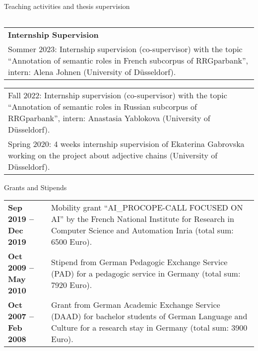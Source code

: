 \documentclass{resume} %
\begin{document}
\begin{rSection}{Teaching activities and thesis supervision}
\begin{tabular}{p{17cm}}
\end{tabular}


\hspace{-20pt}
\begin{tabular}{p{17cm}}
	{\bf Internship Supervision}  \\[10pt]
	Sommer 2023: Internship supervision (co-supervisor) with the topic “Annotation of semantic roles in French subcorpus of RRGparbank”, intern: Alena Johnen (University of D{\"u}sseldorf). \\[5pt]
	
\end{tabular}

\begin{tabular}{p{17cm}}
		
    Fall 2022: Internship supervision (co-supervisor) with the topic “Annotation of semantic roles in Russian subcorpus of RRGparbank”, intern: Anastasia Yablokova (University of D{\"u}sseldorf). \\[5pt]
    
	Spring 2020: 4 weeks internship supervision of Ekaterina Gabrovska working on the project about adjective chains (University of D{\"u}sseldorf). 
	
	
\end{tabular}

\end{rSection}


\begin{rSection}{Grants and Stipends} 

\hspace{-20pt}
\begin{tabular}{p{4cm}p{13cm}}

{\bf Sep 2019 -- Dec 2019} &  Mobility grant ``AI\_PROCOPE-CALL FOCUSED ON AI'' by the French National Institute for Research in Computer Science and Automation Inria (total sum: 6500 Euro).\\[5pt]
{\bf Oct 2009 -- May 2010} &  Stipend from German Pedagogic Exchange Service (PAD) for a pedagogic service in Germany (total sum: 7920 Euro).\\[5pt]
{\bf Oct 2007 -- Feb 2008} &  Grant from German Academic Exchange Service (DAAD) for bachelor students of German Language and Culture for a research stay in Germany (total sum: 3900 Euro).
 
\end{tabular}

\end{rSection}
\end{document}

